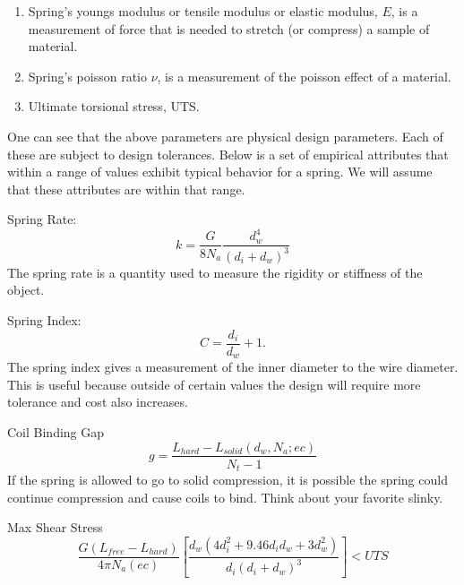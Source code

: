 \documentclass[10pt]{article}
\begin{document}
\begin{enumerate}
			\item Spring's youngs modulus or tensile modulus or elastic modulus, $E$, is a measurement of force that is needed  to stretch (or compress) a sample of material.
			
			\item Spring's poisson ratio $\nu$, is a measurement of the poisson effect of a material. 
			
			\item Ultimate torsional stress, UTS. 
		
		\end{enumerate}
		
One can see that the above parameters are physical design parameters. Each of these are subject to design tolerances. Below is a set of empirical attributes that within a range of values exhibit typical behavior for a spring. We will assume that these attributes are within that range. 
		
			Spring Rate:\begin{equation} k = \frac{G}{8N_{a}}\frac{d_{w}^{4}}{(d_{i} + d_{w})^{3}}\end{equation}
			The spring rate is a quantity used to measure the rigidity or stiffness of the object. 
				
				 Spring Index:\begin{equation}C = \frac{d_{i}}{d_{w}} + 1.\end{equation}
				 The spring index gives a measurement of the inner diameter to the wire diameter. This is useful because outside of certain values the design will require more tolerance and cost also increases. \cite{SpringIndex}
				
				Coil Binding Gap\begin{equation} g = \frac{L_{hard} - L_{solid}(d_{w},N_{a}; ec)}{N_{t} - 1}\end{equation}
				If the spring is allowed to go to solid compression, it is possible the spring could continue compression and cause coils to bind. Think about your favorite slinky. 
		

		
				 Max Shear Stress\begin{equation} \frac{G(L_{free} - L_{hard})}{4 \pi N_{a} (ec)} \left[\frac{d_{w} (4d_{i}^{2} + 9.46d_{i} 
d_{w} + 3 d_{w}^{2})}{d_{i}(d_{i}+d_{w})^{3}}\right]< UTS\end{equation}
\end{document}
